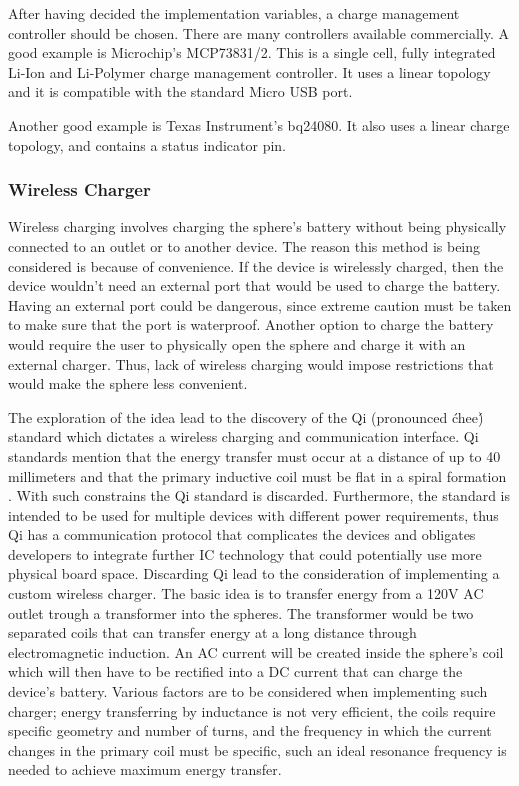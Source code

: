 After having decided the implementation variables, a charge management controller should be chosen. There are many controllers available commercially. A good example is Microchip's MCP73831/2. This is a single cell, fully integrated Li-Ion and Li-Polymer charge management controller. It uses a linear topology and it is compatible with the standard Micro USB port. 

Another good example is Texas Instrument's bq24080. It also uses a linear charge topology, and contains a status indicator pin.
\subsubsection{Wireless Charger}
Wireless charging involves charging the sphere's battery without being physically connected to an outlet or to another device. The reason this method is being considered is because of convenience. If the device is wirelessly charged, then the device wouldn't need an external port that would be used to charge the battery. Having an external port could be dangerous, since extreme caution must be taken to make sure that the port is waterproof. Another option to charge the battery would require the user to physically open the sphere and charge it with an external charger. Thus, lack of wireless charging would impose restrictions that would make the sphere less convenient.

The exploration of the idea lead to the discovery of the Qi (pronounced \'chee\') standard which dictates a wireless charging and communication interface. Qi standards mention that the energy transfer must occur at a distance of up to 40 millimeters and that the primary inductive coil must be flat in a spiral formation \cite{QiStandard}. With such constrains the Qi standard is discarded. Furthermore, the standard is intended to be used for multiple devices with different power requirements, thus Qi has a communication protocol that complicates the devices and obligates developers to integrate further IC technology that could potentially use more physical board space. Discarding Qi lead to the consideration of implementing a custom wireless charger. The basic idea is to transfer energy from a 120V AC outlet trough a transformer into the spheres. The transformer would be two separated coils that can transfer energy at a long distance through electromagnetic induction. An AC current will be created inside the sphere's coil which will then have to be rectified into a DC current that can charge the device's battery. Various factors are to be considered when implementing such charger; energy transferring by inductance is not very efficient, the coils require specific geometry and number of turns, and the frequency in which the current changes in the primary coil must be specific, such an ideal resonance frequency is needed to achieve maximum energy transfer. 

